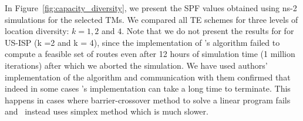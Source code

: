 %








In Figure~\ref{fig:capacity_diversity}, we present the SPF values obtained using ns-2 simulations for the selected TMs. We compared all TE schemes for three levels of location diversity: $k = 1, 2$ and $4$.  Note that we do not present the results for \cope{} for US-ISP (k =2 and k = 4), since the implementation of \cope{}'s algorithm failed to compute a feasible set of routes even after 12 hours of simulation time (1 million iterations)  after which we aborted the simulation. We have used authors' implementation of the algorithm and communication with them confirmed that indeed in some cases \cope{}'s implementation can take a long time to terminate. This happens in cases where barrier-crossover method to solve a linear program fails and \cope\ instead uses simplex method which is much slower.


